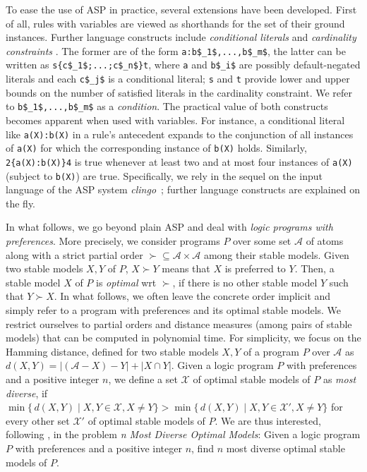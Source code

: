 \documentclass[a4paper,USenglish]{oasics-v2016}
\newcommand{\sysfont}{\textit}
\newcommand{\clingo}{\sysfont{clingo}}
\begin{document}
To ease the use of ASP in practice, 
several extensions have been developed. 
First of all, rules with variables are viewed as shorthands for the set of their ground instances.
Further language constructs include
\emph{conditional literals} and \emph{cardinality constraints} \cite{siniso02a}.
The former are of the form
\lstinline[mathescape=true]{a:b$_1$,...,b$_m$},
the latter can be written as
\lstinline[mathescape=true]+s{c$_1$;...;c$_n$}t+,
where \lstinline{a} and \lstinline[mathescape=true]{b$_i$} are possibly default-negated literals  %
and each \lstinline[mathescape=true]{c$_j$} is a conditional literal; %
\lstinline{s} and \lstinline{t} provide lower and upper bounds on the number of satisfied literals in the cardinality constraint.
We refer to \lstinline[mathescape=true]{b$_1$,...,b$_m$} as a \emph{condition}.
%
The practical value of both constructs becomes apparent when used with variables.
For instance, a conditional literal like
\lstinline[mathescape=true]{a(X):b(X)}
in a rule's antecedent expands to the conjunction of all instances of \lstinline{a(X)} for which the corresponding instance of \lstinline{b(X)} holds.
%
Similarly,
\lstinline[mathescape=true]+2{a(X):b(X)}4+
is true whenever at least two and at most four instances of \lstinline{a(X)} (subject to \lstinline{b(X)}) are true.
%
Specifically, 
we rely in the sequel
on the input language of the ASP system \clingo~\cite{gekakasc14b};
further language constructs are explained on the fly.
 
In what follows, we go beyond plain ASP and deal with \emph{logic programs with preferences}.
%
More precisely,
we consider programs $P$ over some set $\mathcal{A}$ of atoms
along with a strict partial order ${\succ}\subseteq{\mathcal{A}\times\mathcal{A}} $ among their stable models. 
%
Given two stable models $X,Y$ of $P$,
$X\succ Y$ means that $X$ is preferred to $Y$.
%
Then, a stable model $X$ of $P$ is \emph{optimal} wrt $\succ$,
if there is no other stable model $Y$ such that $Y\succ X$.
%
In what follows,
we often leave the concrete order implicit and simply refer to a program with preferences and its optimal stable models.
%
We restrict ourselves to partial orders and distance measures (among pairs of stable models) that can be computed in polynomial time.
%
For simplicity, we focus on the Hamming distance, 
defined for two stable models $X,Y$ of a program $P$ over $\mathcal{A}$ as
\(
d(X,Y)
=
|(\mathcal{A} - X) - Y| + | X \cap Y |
\).
%
Given a logic program $P$ with preferences and a positive integer $n$,
we define %
a set $\mathcal{X}$ of optimal stable models of $P$ as \emph{most diverse},
if
\(
\min \{\, d(X,Y) \mid X, Y \in \mathcal{X},  X \neq Y \} 
> 
\min \{\, d(X,Y) \mid X, Y \in \mathcal{X}', X \neq Y \}
\)
for every other set $\mathcal{X}'$ of optimal stable models of $P$.
%
We are thus interested, following \cite{eiererfi13a}, in the problem \emph{n Most Diverse Optimal Models}:
%
Given a logic program $P$ with preferences and a positive integer $n$, 
find $n$ most diverse optimal stable models of $P$.
\end{document}
